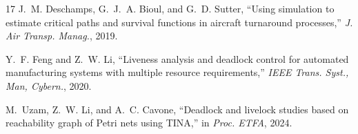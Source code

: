 \documentclass[conference,a4paper]{IEEEtran}
\begin{document}
\begin{thebibliography}{17}
J.~M. Deschamps, G.~J.~A. Bioul, and G.~D. Sutter,
``Using simulation to estimate critical paths and survival functions in
aircraft turnaround processes,''
\textit{J. Air Transp. Manag.}, 2019.

Y.~F. Feng and Z.~W. Li,
``Liveness analysis and deadlock control for automated manufacturing systems
with multiple resource requirements,''
\textit{IEEE Trans. Syst., Man, Cybern.}, 2020.

M.~Uzam, Z.~W. Li, and A.~C. Cavone,
``Deadlock and livelock studies based on reachability graph of Petri nets
using TINA,''
in \textit{Proc. ETFA}, 2024.

\end{thebibliography}
\end{document}
